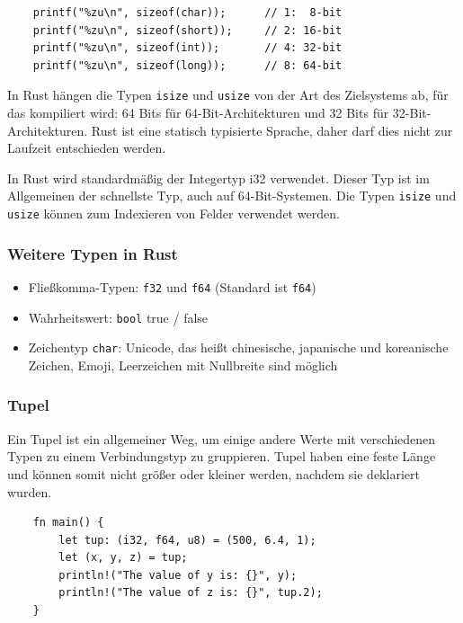 \begin{lstlisting}
    printf("%zu\n", sizeof(char));      // 1:  8-bit
    printf("%zu\n", sizeof(short));     // 2: 16-bit
    printf("%zu\n", sizeof(int));       // 4: 32-bit
    printf("%zu\n", sizeof(long));      // 8: 64-bit
\end{lstlisting}

In Rust hängen die Typen \verb"isize" und \verb"usize" von der Art des Zielsystems ab, für das kompiliert wird: 64 Bits für 64-Bit-Architekturen und 32 Bits für 32-Bit-Architekturen. Rust ist eine statisch typisierte Sprache, daher darf dies nicht zur Laufzeit entschieden werden.

In Rust wird standardmäßig der Integertyp i32 verwendet. Dieser Typ ist im Allgemeinen der schnellste Typ, auch auf 64-Bit-Systemen. Die Typen \verb"isize" und \verb"usize" können zum Indexieren von Felder verwendet werden.

\subsubsection{Weitere Typen in Rust}

\begin{itemize}
    \item Fließkomma-Typen: \verb"f32" und \verb"f64" (Standard ist \verb"f64")
    \item Wahrheitswert: \verb"bool" true / false
    \item Zeichentyp \verb"char": Unicode, das heißt chinesische, japanische und koreanische Zeichen, Emoji, Leerzeichen mit Nullbreite sind möglich
\end{itemize}

\subsubsection{Tupel}

Ein Tupel ist ein allgemeiner Weg, um einige andere Werte mit verschiedenen Typen zu einem Verbindungstyp zu gruppieren. Tupel haben eine feste Länge und können somit nicht größer oder kleiner werden, nachdem sie deklariert wurden.

\newpage

\begin{lstlisting}
    fn main() {
        let tup: (i32, f64, u8) = (500, 6.4, 1);
        let (x, y, z) = tup;
        println!("The value of y is: {}", y);
        println!("The value of z is: {}", tup.2);
    }
\end{lstlisting}

